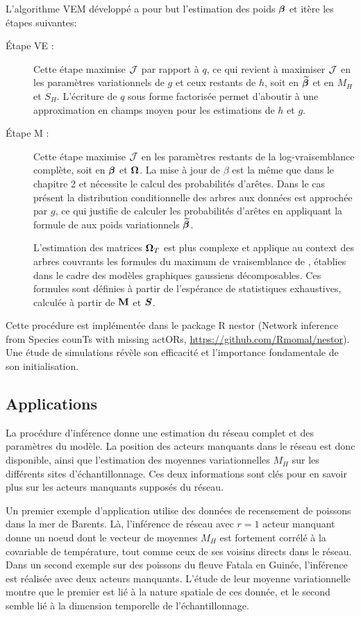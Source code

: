 L'algorithme VEM développé a pour but l'estimation des poids ${\boldsymbol{\beta}}$ et itère les étapes suivantes:
\begin{description}
\item[Étape VE :] Cette étape maximise ${\mathcal{J}}$ par rapport à $q$, ce qui revient à maximiser ${\mathcal{J}}$ en les paramètres variationnels de $g$ et ceux restants de $h$, soit en $\widetilde{{\boldsymbol{\beta}}}$ et en  $M_H$ et $S_H$. L'écriture de $q$ sous forme factorisée  permet d'aboutir à une approximation en champs moyen pour les estimations de $h$ et $g$. 
\item[Étape M :] Cette étape maximise ${\mathcal{J}}$ en les paramètres restants de la log-vraisemblance complète, soit en ${\boldsymbol{\beta}}$ et ${\boldsymbol{\Omega}}$. La mise à jour de $\beta$ est la même que dans le chapitre 2 et nécessite le calcul des probabilités d'arêtes. Dans le cas présent la distribution conditionnelle des arbres aux données est approchée par $g$, ce qui justifie de calculer les probabilités d'arêtes en appliquant la formule de \citet{kirshner} aux poids variationnels $\widetilde{{\boldsymbol{\beta}}}$. 

L'estimation des matrices ${\boldsymbol{\Omega}}_T$ est plus complexe et applique au context des arbres couvrants  les formules du maximum de vraisemblance de \citet{Lau96}, établies dans le cadre des modèles graphiques gaussiens décomposables. Ces formules sont définies à partir de l'espérance de statistiques exhaustives, calculée à partir de ${\bf M}$ et ${\boldsymbol{S}}$.
\end{description}
Cette procédure est implémentée dans le package R nestor (Network inference from Species counTs with missing actORs, \url{https://github.com/Rmomal/nestor}). Une étude de simulations révèle son efficacité et l'importance fondamentale de son initialisation.

\subsection*{Applications}
La procédure d'inférence donne une estimation du réseau complet et des paramètres du modèle. La position des acteurs manquants dans le réseau est donc disponible, ainsi que l'estimation des moyennes variationnelles $M_H$ sur les différents sites d'échantillonnage. Ces deux informations sont clés pour en savoir plus sur les acteurs manquants supposés du réseau. 

Un premier exemple d'application utilise des données de recensement de poissons dans la mer de Barents. Là, l'inférence de réseau avec $r=1$ acteur manquant donne un noeud dont le vecteur de moyennes $M_H$ est fortement corrélé à la covariable de température, tout comme ceux de ses voisins directs dans le réseau. Dans un second exemple sur des poissons du fleuve Fatala en Guinée, l'inférence est réalisée avec deux acteurs manquants. L'étude de leur moyenne variationnelle  montre que le premier est lié à la nature spatiale de ces donnée, et le second semble lié à la dimension temporelle de l'échantillonnage.

